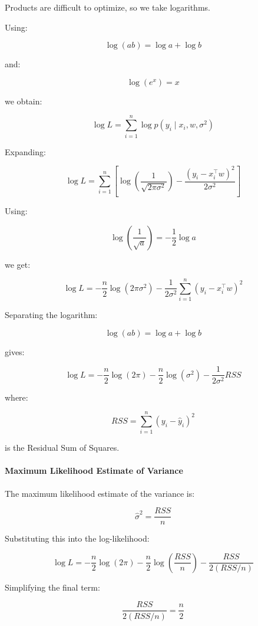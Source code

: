 \documentclass[10pt,a4paper]{article}
\begin{document}
	Products are difficult to optimize, so we take logarithms.
	
	Using:
	
	\[
	\log(ab)=\log a + \log b
	\]
	
	and:
	
	\[
	\log(e^x)=x
	\]
	
	we obtain:
	
	\[
	\log L
	=
	\sum_{i=1}^{n}
	\log p(y_i \mid x_i,w,\sigma^2)
	\]
	
	Expanding:
	
	\[
	\log L
	=
	\sum_{i=1}^{n}
	\left[
	\log
	\left(
	\frac{1}{\sqrt{2\pi\sigma^2}}
	\right)
	-
	\frac{(y_i-x_i^\top w)^2}{2\sigma^2}
	\right]
	\]
	
	Using:
	
	\[
	\log
	\left(
	\frac{1}{\sqrt{a}}
	\right)
	=
	-\frac12 \log a
	\]
	
	we get:
	
	\[
	\log L
	=
	-\frac{n}{2}\log(2\pi\sigma^2)
	-
	\frac{1}{2\sigma^2}
	\sum_{i=1}^{n}
	(y_i-x_i^\top w)^2
	\]
	
	Separating the logarithm:
	
	\[
	\log(ab)=\log a + \log b
	\]
	
	gives:
	
	\[
	\boxed{
	\log L
	=
	-\frac{n}{2}\log(2\pi)
	-
	\frac{n}{2}\log(\sigma^2)
	-
	\frac{1}{2\sigma^2}RSS
	}
	\]
	
	where:
	
	\[
	RSS
	=
	\sum_{i=1}^{n}
	(y_i-\hat{y}_i)^2
	\]
	
	is the Residual Sum of Squares.
	
	\vspace{0.5em}
	
	\paragraph{Maximum Likelihood Estimate of Variance}
	
	The maximum likelihood estimate of the variance is:
	
	\[
	\boxed{
	\hat{\sigma}^2
	=
	\frac{RSS}{n}
	}
	\]
	
	Substituting this into the log-likelihood:
	
	\[
	\log L
	=
	-\frac{n}{2}\log(2\pi)
	-
	\frac{n}{2}\log
	\left(
	\frac{RSS}{n}
	\right)
	-
	\frac{RSS}{2(RSS/n)}
	\]
	
	Simplifying the final term:
	
	\[
	\frac{RSS}{2(RSS/n)}
	=
	\frac{n}{2}
	\]
	
\end{document}
